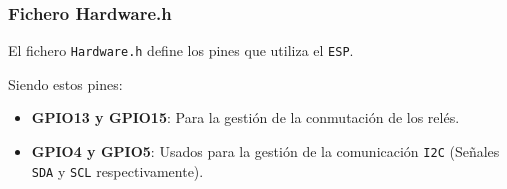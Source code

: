 \subsubsection{Fichero Hardware.h}

El fichero \texttt{Hardware.h} define los pines que utiliza el \texttt{ESP}. 

Siendo estos pines:
\begin{itemize}
    \item \textbf{GPIO13 y GPIO15}: Para la gestión de la conmutación de los relés. 
    \item \textbf{GPIO4 y GPIO5}: Usados para la gestión de la comunicación \texttt{I2C} (Señales \texttt{SDA} y \texttt{SCL} respectivamente). 
\end{itemize}
